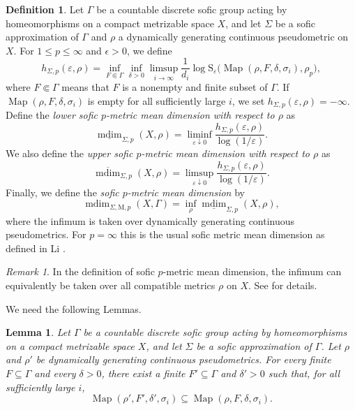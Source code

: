 \documentclass[12pt]{amsart}
\newtheorem{lemma}[theorem]{Lemma}
\theoremstyle{definition}
\newtheorem{definition}[theorem]{Definition}
\theoremstyle{remark}
\newtheorem{remark}[theorem]{Remark}
\newcommand{\Map}{\operatorname{Map}}
\newcommand{\mdim}{\operatorname{mdim}}
\begin{document}
\begin{definition}
Let $\Gamma$ be a countable discrete sofic group acting by homeomorphisms on a compact metrizable
space $X$, and let $\Sigma$ be a sofic approximation of $\Gamma$ and $\rho$ a dynamically generating continuous pseudometric on $X$.
For $1\leq p\leq\infty$ and $\epsilon>0$, we define 
\[
 h_{\Sigma,p}(\varepsilon,\rho)
 =\inf_{F\Subset\Gamma}\inf_{\delta>0}
 \limsup_{i\to\infty}\frac1{d_i}
 \log \mathrm{S}_\varepsilon\bigl(\Map(\rho,F,\delta,\sigma_i),\rho_p\bigr),
 \tag{2.1}
\]
where $F\Subset\Gamma$ means that $F$ is a nonempty and finite subset of $\Gamma$. If $\Map(\rho,F,\delta,\sigma_i)$ is
empty for all sufficiently large $i$, we set 
$ h_{\Sigma,p}(\varepsilon,\rho)=-\infty$. 
Define the \emph{lower sofic $p$-metric mean dimension with respect to  $\rho$}  as
\[
 \underline{\mdim}_{\Sigma,p}(X,\rho)
 =\liminf_{\varepsilon\downarrow0}
 \frac{h_{\Sigma,p}(\varepsilon,\rho)}{\log(1/\varepsilon)}.
 \tag{2.2}
\]
We also  define the \emph{upper sofic $p$-metric mean dimension with respect to  $\rho$} as 
\[
 \overline{\mdim}_{\Sigma,p}(X,\rho)
 =\limsup_{\varepsilon\downarrow0}
 \frac{h_{\Sigma,p}(\varepsilon,\rho)}{\log(1/\varepsilon)}.
 \tag{2.3}
\]
Finally, we define the \emph{ sofic $p$-metric mean dimension } by
\[
 \mdim_{\Sigma,\mathrm M,p}(X,\Gamma)
 =\inf_\rho \underline{\mdim}_{\Sigma,p}(X,\rho),
 \tag{2.4}
\]
where the infimum is taken over dynamically generating continuous pseudometrics. For $p=\infty$ this is the usual sofic metric mean dimension as defined in Li \cite{Li}.
\end{definition}
\begin{remark}\label{rem:compatible}
In the definition of sofic $p$-metric mean dimension,  the infimum can equivalently be taken over all compatible metrics $\rho$ on $X$. See \cite{Hayes,Li} for details.
\end{remark}



We need the following Lemmas.
\begin{lemma}\cite[Lemma 2.14]{Hayes}
\label{lem:hayes-input}
Let $\Gamma$ be a countable discrete sofic group acting by homeomorphisms on a compact metrizable
space $X$, and let $\Sigma$ be a sofic approximation of $\Gamma$.
 Let $\rho$ and $\rho'$ be dynamically generating continuous pseudometrics. For every finite $F\subseteq\Gamma$ and every $\delta>0$, there exist a finite $F'\subseteq\Gamma$ and $\delta'>0$ such that, for all sufficiently large $i$,
 \[
  \Map(\rho',F',\delta',\sigma_i)
  \subseteq \Map(\rho,F,\delta,\sigma_i).
  \tag{2.5}
 \]


\end{lemma}
\end{document}
